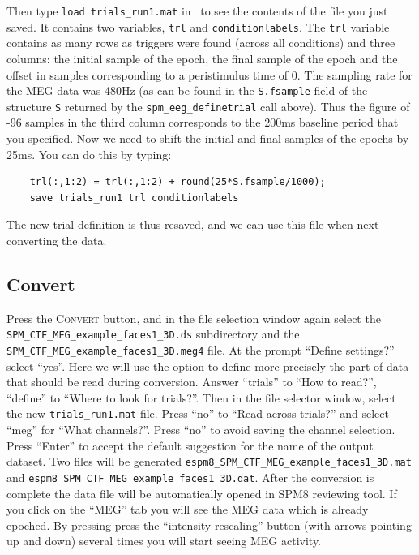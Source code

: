Then type \texttt{load trials\_run1.mat} in \matlab\, to see the contents of the file you just saved. It contains two variables, \texttt{trl} and \texttt{conditionlabels}. The \texttt{trl} variable contains as many rows as triggers were found (across all conditions) and three columns: the initial sample of the epoch, the final sample of the epoch and the offset in samples corresponding to a peristimulus time of 0. The sampling rate for the MEG data was 480Hz (as can be found in the \texttt{S.fsample} field of the structure \texttt{S} returned by the \texttt{spm\_eeg\_definetrial} call above). Thus the figure of -96 samples in the third column corresponds to the 200ms baseline period that you specified. Now we need to shift the initial and final samples of the epochs by 25ms. You can do this by typing:

\begin{verbatim}
    trl(:,1:2) = trl(:,1:2) + round(25*S.fsample/1000);
    save trials_run1 trl conditionlabels
\end{verbatim}

The new trial definition is thus resaved, and we can use this file when next converting the data.

\subsection{Convert}

Press the \textsc{Convert} button, and in the file selection window again select the \texttt{SPM\_CTF\_MEG\_example\_\-faces1\_3D.ds} subdirectory and the \texttt{\hyphenchar{}\relax SPM\_CTF\_MEG\_example\_faces1\_3D.meg4} file. At the prompt ``Define settings?'' select ``yes''. Here we will use the option to define more precisely the part of data that should be read during conversion. Answer ``trials'' to ``How to read?'', ``define'' to ``Where to look for trials?''. Then in the file selector window, select the new \texttt{trials\_run1.mat} file. Press ``no'' to ``Read across trials?'' and select ``meg'' for ``What channels?''. Press ``no'' to avoid saving the channel selection. Press ``Enter'' to accept the default suggestion for the name of the output dataset. Two files will be generated \texttt{espm8\_SPM\_CTF\_MEG\_example\_faces1\_3D.mat} and \texttt{espm8\_SPM\_CTF\_MEG\_example\_faces1\_3D.dat}. After the conversion is complete the data file will be automatically opened in SPM8 reviewing tool. If you click on the ``MEG'' tab you will see the MEG data which is already epoched. By pressing press the ``intensity rescaling'' button (with arrows pointing up and down) several times you will start seeing MEG activity.

